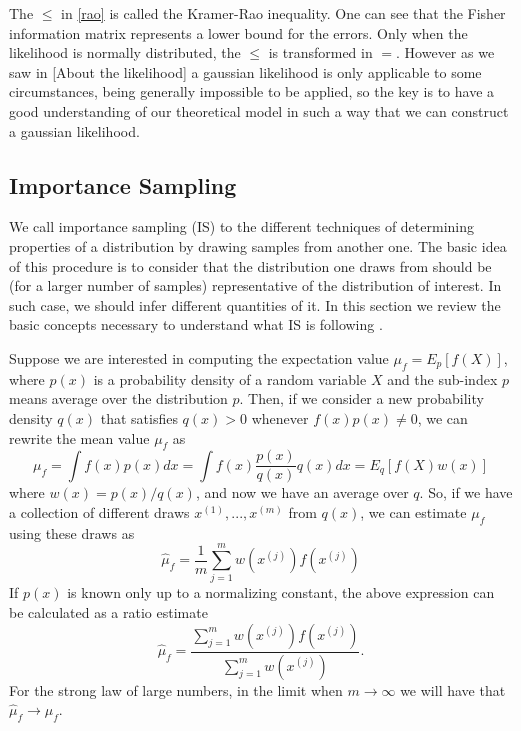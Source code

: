 \documentclass[onecolumn,           %
               showpacs,            %
               preprintnumbers,     %
               aps,                 %
               letterpaper,             %
               superscriptaddress,      %
               nofootinbib,         %
               tightenlines,        %
               floats,floatfix      %
               ,usenatbib,
               ]{revtex4-1}
\begin{document}
The $\leq$ in \eqref{rao} is called the Kramer-Rao inequality. One can see that the Fisher information matrix represents a lower bound for the errors. Only when the likelihood is normally distributed, the $\leq$ is transformed in $=$. However as we saw in [About the likelihood] a gaussian likelihood is only applicable to some circumstances, being generally impossible to be applied, so the key is to have a good understanding of our theoretical model in such a way that we can construct a gaussian likelihood.

\subsection{Importance Sampling}

We call importance sampling (IS) to the different techniques of determining properties of a distribution by drawing samples from another one. The basic idea of this procedure is to consider that the distribution one draws from should be (for a larger number of samples) representative of the distribution of interest. In such case, we should infer different quantities of it. In this section we review the basic concepts necessary to understand what IS is following \cite{importancesampling}.

Suppose we are interested in computing the expectation value $\mu_f=E_p[f(X)]$, where $p(x)$ is a probability density of a random variable $X$ and the sub-index $p$ means average over the distribution $p$. Then, if we consider a new probability density $q(x)$ that satisfies $q(x)>0$ whenever $f(x)p(x)\not = 0$, we can rewrite the mean value $\mu_f$ as
\begin{equation}
\mu_f = \int f(x)p(x)dx=\int f(x)\frac{p(x)}{q(x)}q(x)dx=E_q[f(X)w(x)]
\end{equation}
where $w(x)=p(x)/q(x)$, and now we have an average over $q$. So, if we have a collection of different draws $x^{(1)},...,x^{(m)}$ from $q(x)$, we can estimate $\mu_f$ using these draws as
\begin{equation}
\hat \mu_f = \frac{1}{m}\sum_{j=1}^m w(x^{(j)})f(x^{(j)})
\end{equation}
If $p(x)$ is known only up to a normalizing constant, the above expression can be calculated  as a ratio estimate
\begin{equation}
\hat \mu_f=\frac{\sum_{j=1}^m w(x^{(j)})f(x^{(j)})}{\sum_{j=1}^mw(x^{(j)})}.
\end{equation}
For the strong law of large numbers, in the limit when $m\rightarrow \infty$ we will have that $\hat \mu_f\rightarrow \mu_f$.
\end{document}
